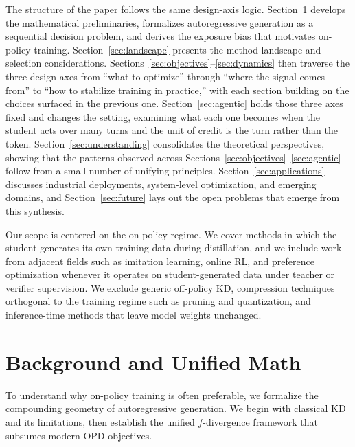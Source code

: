 \documentclass{article} %
\begin{document}
The structure of the paper follows the same design-axis logic. Section~\ref{sec:background} develops the mathematical preliminaries, formalizes autoregressive generation as a sequential decision problem, and derives the exposure bias that motivates on-policy training. Section~\ref{sec:landscape} presents the method landscape and selection considerations. Sections~\ref{sec:objectives}--\ref{sec:dynamics} then traverse the three design axes from ``what to optimize'' through ``where the signal comes from'' to ``how to stabilize training in practice,'' with each section building on the choices surfaced in the previous one. Section~\ref{sec:agentic} holds those three axes fixed and changes the setting, examining what each one becomes when the student acts over many turns and the unit of credit is the turn rather than the token. Section~\ref{sec:understanding} consolidates the theoretical perspectives, showing that the patterns observed across Sections~\ref{sec:objectives}--\ref{sec:agentic} follow from a small number of unifying principles. Section~\ref{sec:applications} discusses industrial deployments, system-level optimization, and emerging domains, and Section~\ref{sec:future} lays out the open problems that emerge from this synthesis.

Our scope is centered on the on-policy regime. We cover methods in which the student generates its own training data during distillation, and we include work from adjacent fields such as imitation learning, online RL, and preference optimization whenever it operates on student-generated data under teacher or verifier supervision. We exclude generic off-policy KD, compression techniques orthogonal to the training regime such as pruning and quantization, and inference-time methods that leave model weights unchanged.

\section{Background and Unified Math}
\label{sec:background}

To understand why on-policy training is often preferable, we formalize the compounding geometry of autoregressive generation. We begin with classical KD and its limitations, then establish the unified $f$-divergence framework that subsumes modern OPD objectives.
\end{document}
